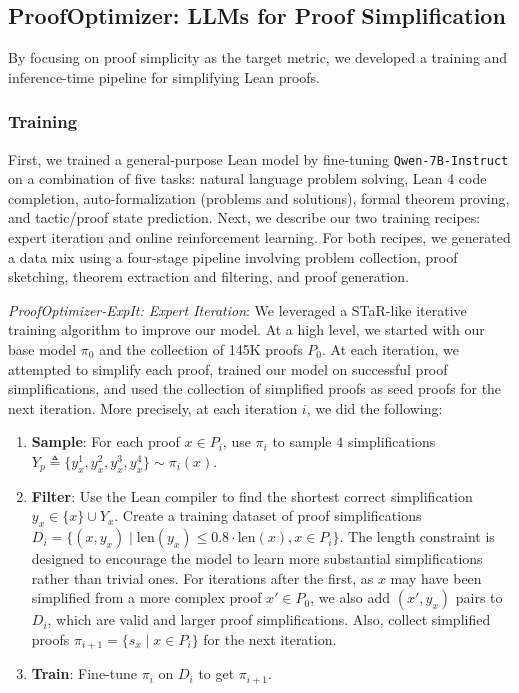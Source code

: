 
\subsection{ProofOptimizer: LLMs for Proof Simplification}

By focusing on proof simplicity as the target metric, we developed
a training and inference-time pipeline for simplifying Lean proofs.

\subsubsection{Training} \label{sec:expit-rl}

First, we trained a general-purpose Lean model by fine-tuning \texttt{Qwen\allowbreak-7B\allowbreak-Instruct} on a combination of five tasks: natural language problem solving, Lean 4 code completion, auto-formalization (problems and solutions), formal theorem proving, and tactic/proof state prediction.
Next, we describe our two training recipes: expert iteration and online reinforcement learning.
For both recipes, we generated a data mix using a four-stage pipeline involving problem collection, proof
sketching, theorem extraction and filtering, and proof generation.

\textit{ProofOptimizer-ExpIt: Expert Iteration}:
We leveraged a STaR-like \citep{zelikman2022star} iterative training algorithm to improve our model. At a high level, we started with our base model $\pi_0$ and the collection of 145K proofs $P_0$. At each iteration, we attempted to simplify each proof, trained our model on successful proof simplifications, and used the collection of simplified proofs as seed proofs for the next iteration. More precisely, at each iteration $i$, we did the following:
\begin{enumerate}
\itemsep1pt
    \item \textbf{Sample}: For each proof $x \in P_i$, use $\pi_i$ to sample $4$ simplifications $Y_p \triangleq \{y_x^{1}, y_x^{2}, y_x^{3}, y_x^{4}\} \sim \pi_i(x)$.
    \item \textbf{Filter}: Use the Lean compiler to find the shortest correct simplification $y_x \in \{x\} \cup Y_x$. Create a training dataset of proof simplifications $D_i = \{(x, y_x) \mid \text{len}(y_x) \le 0.8 \cdot \text{len}(x), x \in P_i\}$. The length constraint is designed to encourage the model to learn more substantial simplifications rather than trivial ones. For iterations after the first, as $x$ may have been simplified from a more complex proof $x' \in P_0$, we also add $(x', y_x)$ pairs to $D_i$, which are valid and larger proof simplifications. Also, collect simplified proofs $\pi_{i+1} = \{s_x \mid x \in P_i\}$ for the next iteration.
    \item \textbf{Train}: Fine-tune $\pi_i$ on $D_i$ to get $\pi_{i+1}$.
\end{enumerate}



